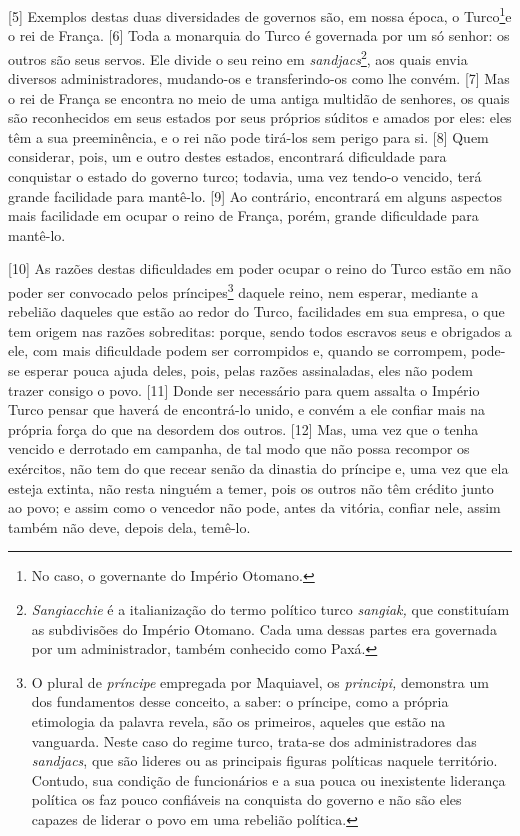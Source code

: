 {[}5{]} Exemplos destas duas diversidades de governos são, em nossa
época, o Turco\footnote{No caso, o governante do Império Otomano.}e o
rei de França. {[}6{]} Toda a monarquia do Turco é governada por um só
senhor: os outros são seus servos. Ele divide o seu reino em
\emph{sandjacs}\footnote{\emph{Sangiacchie} é a italianização do termo
  político turco \emph{sangiak,} que constituíam as subdivisões do
  Império Otomano. Cada uma dessas partes era governada por um
  administrador, também conhecido como Paxá.}, aos quais envia diversos
administradores, mudando-os e transferindo-os como lhe convém. {[}7{]}
Mas o rei de França se encontra no meio de uma antiga multidão de
senhores, os quais são reconhecidos em seus estados por seus próprios
súditos e amados por eles: eles têm a sua preeminência, e o rei não pode
tirá-los sem perigo para si. {[}8{]} Quem considerar, pois, um e outro
destes estados, encontrará dificuldade para conquistar o estado do
governo turco; todavia, uma vez tendo-o vencido, terá grande facilidade
para mantê-lo. {[}9{]} Ao contrário, encontrará em alguns aspectos mais
facilidade em ocupar o reino de França, porém, grande dificuldade para
mantê-lo.

{[}10{]} As razões destas dificuldades em poder ocupar o reino do Turco
estão em não poder ser convocado pelos príncipes\footnote{O plural de
  \emph{príncipe} empregada por Maquiavel, os \emph{principi,} demonstra
  um dos fundamentos desse conceito, a saber: o príncipe, como a própria
  etimologia da palavra revela, são os primeiros, aqueles que estão na
  vanguarda. Neste caso do regime turco, trata-se dos administradores
  das \emph{sandjacs}, que são lideres ou as principais figuras
  políticas naquele território. Contudo, sua condição de funcionários e
  a sua pouca ou inexistente liderança política os faz pouco confiáveis
  na conquista do governo e não são eles capazes de liderar o povo em
  uma rebelião política.} daquele reino, nem esperar, mediante a
rebelião daqueles que estão ao redor do Turco, facilidades em sua
empresa, o que tem origem nas razões sobreditas: porque, sendo todos
escravos seus e obrigados a ele, com mais dificuldade podem ser
corrompidos e, quando se corrompem, pode-se esperar pouca ajuda deles,
pois, pelas razões assinaladas, eles não podem trazer consigo o povo.
{[}11{]} Donde ser necessário para quem assalta o Império Turco pensar
que haverá de encontrá-lo unido, e convém a ele confiar mais na própria
força do que na desordem dos outros. {[}12{]} Mas, uma vez que o tenha
vencido e derrotado em campanha, de tal modo que não possa recompor os
exércitos, não tem do que recear senão da dinastia do príncipe e, uma
vez que ela esteja extinta, não resta ninguém a temer, pois os outros
não têm crédito junto ao povo; e assim como o vencedor não pode, antes
da vitória, confiar nele, assim também não deve, depois dela, temê-lo.

